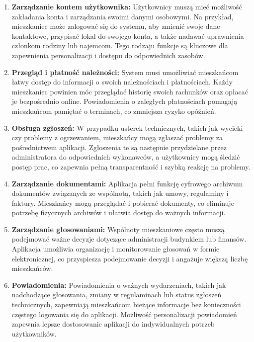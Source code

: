 \begin{enumerate}[label=\arabic*.] 

	\item \textbf{Zarządzanie kontem użytkownika:} Użytkownicy muszą mieć możliwość zakładania konta i zarządzania swoimi danymi osobowymi. Na przykład, mieszkaniec może zalogować się do systemu, aby zmienić swoje dane kontaktowe, przypisać lokal do swojego konta, a także nadawać uprawnienia członkom rodziny lub najemcom. Tego rodzaju funkcje są kluczowe dla zapewnienia personalizacji i dostępu do odpowiednich zasobów.
	
	\item \textbf{Przegląd i płatność należności:} System musi umożliwiać mieszkańcom łatwy dostęp do informacji o swoich należnościach i płatnościach. Każdy mieszkaniec powinien móc przeglądać historię swoich rachunków oraz opłacać je bezpośrednio online. Powiadomienia o zaległych płatnościach pomagają mieszkańcom pamiętać o terminach, co zmniejsza ryzyko opóźnień.

	\item \textbf{Obsługa zgłoszeń:} W przypadku usterek technicznych, takich jak wycieki czy problemy z ogrzewaniem, mieszkańcy mogą zgłaszać problemy za pośrednictwem aplikacji. Zgłoszenia te są następnie przydzielane przez administratora do odpowiednich wykonawców, a użytkownicy mogą śledzić postęp prac, co zapewnia pełną transparentność i szybką reakcję na problemy.

	\item \textbf{Zarządzanie dokumentami:} Aplikacja pełni funkcję cyfrowego archiwum dokumentów związanych ze wspólnotą, takich jak umowy, regulaminy i faktury. Mieszkańcy mogą przeglądać i pobierać dokumenty, co eliminuje potrzebę fizycznych archiwów i ułatwia dostęp do ważnych informacji.

	\item \textbf{Zarządzanie głosowaniami:} Wspólnoty mieszkaniowe często muszą podejmować ważne decyzje dotyczące administracji budynkiem lub finansów. Aplikacja umożliwia organizację i monitorowanie głosowań w formie elektronicznej, co przyspiesza podejmowanie decyzji i angażuje większą liczbę mieszkańców.

	\item \textbf{Powiadomienia:} Powiadomienia o ważnych wydarzeniach, takich jak nadchodzące głosowania, zmiany w regulaminach lub status zgłoszeń technicznych, zapewniają mieszkańcom bieżące informacje bez konieczności częstego logowania się do aplikacji. Możliwość personalizacji powiadomień zapewnia lepsze dostosowanie aplikacji do indywidualnych potrzeb użytkowników.


\end{enumerate}
